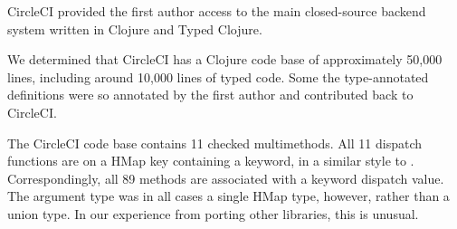 CircleCI provided the first author access to the main closed-source backend system written in Clojure
and Typed Clojure.

We determined that
CircleCI has a Clojure code base of approximately 50,000 lines, including around 10,000 
lines of typed code.
Some the type-annotated definitions were so annotated by the first
author and contributed back to CircleCI.
%

%

The CircleCI code base contains 11 checked multimethods.
 All 11 dispatch functions
are on a HMap key containing a keyword, in a similar style to
.
Correspondingly, all 89 methods are associated with a keyword dispatch value.
The argument type was in all cases a single HMap type, however,
rather than a union type.
In our experience from porting other libraries, this is unusual.



